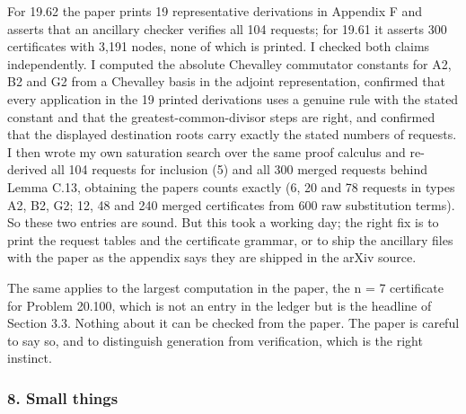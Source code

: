 For 19.62 the paper prints 19 representative derivations in Appendix F
and asserts that an ancillary checker verifies all 104 requests; for
19.61 it asserts 300 certificates with 3,191 nodes, none of which is
printed. I checked both claims independently. I computed the absolute
Chevalley commutator constants for A2, B2 and G2 from a Chevalley basis
in the adjoint representation, confirmed that every application in the
19 printed derivations uses a genuine rule with the stated constant and
that the greatest-common-divisor steps are right, and confirmed that the
displayed destination roots carry exactly the stated numbers of
requests. I then wrote my own saturation search over the same proof
calculus and re-derived all 104 requests for inclusion (5) and all 300
merged requests behind Lemma C.13, obtaining the paper\textquotesingle s
counts exactly (6, 20 and 78 requests in types A2, B2, G2; 12, 48 and
240 merged certificates from 600 raw substitution terms). So these two
entries are sound. But this took a working day; the right fix is to
print the request tables and the certificate grammar, or to ship the
ancillary files with the paper as the appendix says they are shipped in
the arXiv source.

The same applies to the largest computation in the paper, the n = 7
certificate for Problem 20.100, which is not an entry in the ledger but
is the headline of Section 3.3. Nothing about it can be checked from the
paper. The paper is careful to say so, and to distinguish generation
from verification, which is the right instinct.

\hypertarget{review-md-small-things}{%
\subsubsection*{8. Small things}\label{review-md-small-things}}

